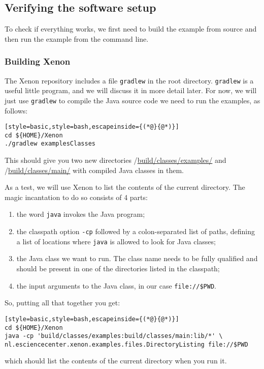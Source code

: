 
\subsection{Verifying the software setup}

To check if everything works, we first need to build the example from source and then run the example from the command line.

\subsubsection{Building Xenon}


The Xenon repository includes a file \texttt{gradlew} in the root directory. \texttt{gradlew} is a useful little program, and we will discuss it in more detail later. For now, we will just use \texttt{gradlew} to compile the Java source code we need to run the examples, as follows:

\begin{lstlisting}[style=basic,style=bash,escapeinside={(*@}{@*)}]
cd ${HOME}/Xenon
./gradlew examplesClasses
\end{lstlisting} %

This should give you two new directories \mytilde{}/\url{build/classes/examples/} and \mytilde{}/\url{build/classes/main/} with compiled Java classes in them.

As a test, we will use Xenon to list the contents of the current directory. The magic incantation to do so consists of 4 parts:
\begin{enumerate}
\item{the word \texttt{java} invokes the Java program;}
\item{the classpath option \texttt{-cp} followed by a colon-separated list of paths, defining a list of locations where \texttt{java} is allowed to look for Java classes;}
\item{the Java class we want to run. The class name needs to be fully qualified and should be present in one of the directories listed in the classpath;}
\item{the input arguments to the Java class, in our case \texttt{file://\$PWD}.}
\end{enumerate}

So, putting all that together you get:
\begin{lstlisting}[style=basic,style=bash,escapeinside={(*@}{@*)}]
cd ${HOME}/Xenon
java -cp 'build/classes/examples:build/classes/main:lib/*' \
nl.esciencecenter.xenon.examples.files.DirectoryListing file://$PWD
\end{lstlisting} %
which should list the contents of the current directory when you run it.


